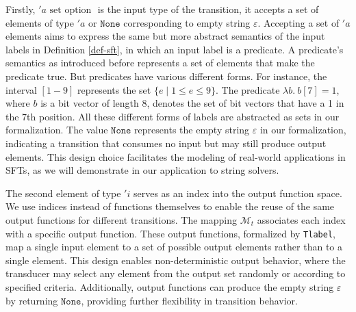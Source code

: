 \documentclass[a4paper,UKenglish,cleveref, autoref, thm-restate]{lipics-v2021}
\begin{document}
Firstly, $'a \text{ set option }$ is the input type of the transition, it accepts a set of elements of type $'a$ or $\texttt{None}$ corresponding to empty string $\varepsilon$. 
Accepting a set of $'a$ elements aims to express the same but more abstract semantics of the input labels in Definition \ref{def-sft}, in which an input label is a predicate. A predicate's semantics as introduced before represents a set of elements that make the predicate true. But predicates have various different forms. For instance, the interval $[1-9]$ represents the set $\{e \mid 1 \leq e \leq 9\}$. The predicate $\lambda b.~ b[7] = 1$, where $b$ is a bit vector of length 8, denotes the set of bit vectors that have a 1 in the 7th position. All these different forms of labels are abstracted as sets in our formalization.
%
The value $\texttt{None}$ represents the empty string $\varepsilon$ in our formalization, indicating a transition that consumes no input but may still produce output elements. This design choice facilitates the modeling of real-world applications in SFTs, as we will demonstrate in our application to string solvers.

The second element of type $'i$ serves as an index into the output function space. 
%
We use indices instead of functions themselves to enable the reuse of the same output functions for different transitions.
%
The mapping $\mathcal{M}_t$ associates each index with a specific output function. These output functions, formalized by \texttt{Tlabel}, map a single input element to a set of possible output elements rather than to a single element. This design enables non-deterministic output behavior, where the transducer may select any element from the output set randomly or according to specified criteria. Additionally, output functions can produce the empty string $\varepsilon$ by returning $\texttt{None}$, providing further flexibility in transition behavior.

\end{document}
